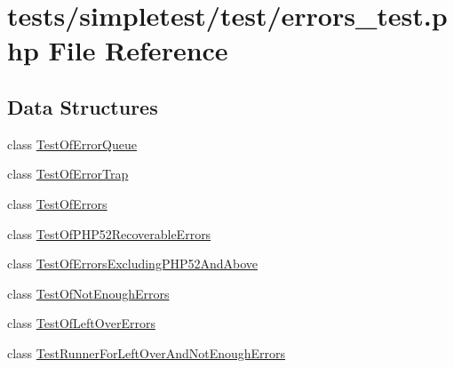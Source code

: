 \hypertarget{errors__test_8php}{\section{tests/simpletest/test/errors\-\_\-test.php File Reference}
\label{errors__test_8php}
}
\subsection*{Data Structures}
\begin{DoxyCompactItemize}
\item 
class \hyperlink{class_test_of_error_queue}{Test\-Of\-Error\-Queue}
\item 
class \hyperlink{class_test_of_error_trap}{Test\-Of\-Error\-Trap}
\item 
class \hyperlink{class_test_of_errors}{Test\-Of\-Errors}
\item 
class \hyperlink{class_test_of_p_h_p52_recoverable_errors}{Test\-Of\-P\-H\-P52\-Recoverable\-Errors}
\item 
class \hyperlink{class_test_of_errors_excluding_p_h_p52_and_above}{Test\-Of\-Errors\-Excluding\-P\-H\-P52\-And\-Above}
\item 
class \hyperlink{class_test_of_not_enough_errors}{Test\-Of\-Not\-Enough\-Errors}
\item 
class \hyperlink{class_test_of_left_over_errors}{Test\-Of\-Left\-Over\-Errors}
\item 
class \hyperlink{class_test_runner_for_left_over_and_not_enough_errors}{Test\-Runner\-For\-Left\-Over\-And\-Not\-Enough\-Errors}
\end{DoxyCompactItemize}
